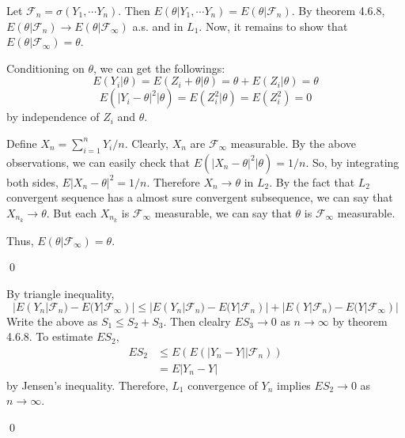 \begin{problem}[4.6.1] \hfill

	Let $\mathcal{F}_n = \sigma\left( Y_1, \cdots Y_n \right)$.
	Then $E(\theta | Y_1, \cdots Y_n) = E(\theta | \mathcal{F}_n)$.
	By theorem 4.6.8, $E(\theta | \mathcal{F}_n) \rightarrow E(\theta | \mathcal{F}_\infty)$ a.s. and in $L_1$.
	Now, it remains to show that $E(\theta |\mathcal{F}_\infty) = \theta$.

	Conditioning on $\theta$, we can get the followings:
	\[
		E(Y_i |\theta) = E(Z_i + \theta | \theta) = \theta + E(Z_i | \theta) = \theta
	\]
	\[
		E( |Y_i - \theta|^2 |\theta) = E(Z_i^2 |\theta) = E(Z_i^2) = 0
	\]
	by independence of $Z_i$ and $\theta$.

	Define $X_n = \sum_{i=1}^n Y_i /n$. Clearly, $X_n$ are $\mathcal{F}_\infty$ measurable.
	By the above observations, we can easily check that $E(|X_n - \theta|^2 | \theta) = 1/n$.
	So, by integrating both sides, $E|X_n - \theta|^2 = 1/n$.
	Therefore $X_n \rightarrow \theta$ in $L_2$.
	By the fact that $L_2$ convergent sequence has a almost sure convergent subsequence,
	we can say that $X_{n_k} \rightarrow \theta$.
	But each $X_{n_k}$ is $\mathcal{F}_\infty$ measurable, we can say that $\theta$ is $\mathcal{F}_\infty$ measurable.

	Thus, $E(\theta | \mathcal{F}_\infty) = \theta$.

	\qed
\end{problem}

\begin{problem}[4.6.7] \hfill

	By triangle inequality,
\[
	| E(Y_n | \mathcal{F}_n ) - E(Y |\mathcal{F}_\infty) |
	\leq |E(Y_n | \mathcal{F}_n ) - E(Y | \mathcal{F}_n) | + | E(Y | \mathcal{F}_n) - E(Y|\mathcal{F}_\infty) |
\]
Write the above as $S_1 \leq S_2 + S_3$.
Then clealry $E S_3 \rightarrow 0$ as $n \rightarrow \infty$ by theorem 4.6.8.
To estimate $E S_2$,
\[
	\begin{split}
		ES_2
		& \leq E \left( E\left(  |Y_n - Y| | \mathcal{F}_n \right) \right) \\
		& = E|Y_n -Y|
	\end{split}
\]
by Jensen's inequality.
Therefore, $L_1$ convergence of $Y_n$ implies $ES_2 \rightarrow 0$ as $n\rightarrow \infty$.

\qed

	
\end{problem}
